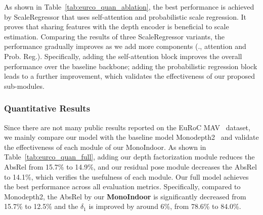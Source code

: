As shown in Table~\ref{tab:eurco_quan_ablation}, the best performance is achieved by ScaleRegressor that uses self-attention and probabilistic scale regression. It proves that sharing features with the depth encoder is beneficial to scale estimation.
Comparing the results of three ScaleRegressor variants, the performance gradually improves as we add more components (\ie., attention and Prob. Reg.). Specifically, adding the self-attention block improves the overall performance over the baseline backbone; adding the probabilistic regression block leads to a further improvement, which validates the effectiveness of our proposed sub-modules.


\subsubsection{Quantitative Results}
Since there are not many public results reported on the EuRoC MAV~\cite{schonberger2016structure} dataset, we mainly compare our model with the baseline model Monodepth2~\cite{godard2019digging} and validate the effectiveness of each module of our MonoIndoor.
As shown in Table~\ref{tab:eurco_quan_full}, adding our depth factorization module reduces the AbsRel from 15.7\% to 14.9\%, and  our residual pose module decreases the AbsRel to 14.1\%, which verifies the usefulness of each module. Our full model achieves the best performance across all evaluation metrics. Specifically, compared to Monodepth2, the AbsRel by our {\bf MonoIndoor} is significantly decreased from 15.7\% to 12.5\% and the $\delta_1$ is improved by around 6\%, from 78.6\% to 84.0\%.


\begin{table}[!h]
    \caption{Ablation results of our MonoIndoor and quantitative comparison with the baseline on the test sequence V2\_01 of EuRoC. Best results are in \textbf{bold}.}
    \label{tab:eurco_quan_full}
    \centering
\end{table}



